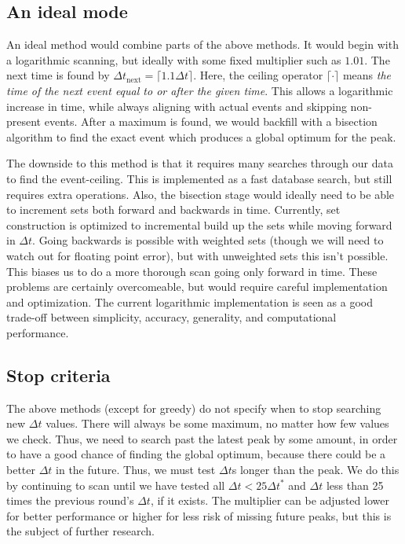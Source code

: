 \documentclass[draft]{article}
\begin{document}
\subsection{An ideal mode}
An ideal method would combine parts of the above methods.  It would
begin with a logarithmic scanning, but ideally with some fixed
multiplier such as $1.01$.  The next time is found by $\Delta
t_\mathrm{next} = \lceil 1.1\Delta t \rceil$.  Here, the ceiling
operator $\lceil \cdot \rceil$ means \textit{the time of the next
  event equal to or after the given time}.  This allows a logarithmic
increase in time, while always aligning with actual events and
skipping non-present events.  After a maximum is found, we would
backfill with a bisection algorithm to find the exact event which
produces a global optimum for the peak.

The downside to this method is that it requires many searches through
our data to find the event-ceiling.  This is implemented as a fast
database search, but still requires extra operations.  Also, the
bisection stage would ideally need to be able to increment sets both
forward and backwards in time.  Currently, set construction is
optimized to incremental build up the sets while moving forward in
$\Delta t$.  Going backwards is possible with weighted sets (though we
will need to watch out for floating point error), but with unweighted
sets this isn't possible.  This biases us to do a more thorough scan
going only forward in time.  These problems are certainly
overcomeable, but would require careful implementation and
optimization.  The current logarithmic implementation is seen as a
good trade-off between simplicity, accuracy, generality, and
computational performance.

\subsection{Stop criteria}
\label{sec:meth-stop-criteria}
The above methods (except for greedy) do not specify when to stop
searching new $\Delta t$ values.  There will always be some maximum,
no matter how few values we check.  Thus, we need to search past the
latest peak by some amount, in order to have a good chance of finding
the global optimum, because there could be a better $\Delta t$ in the
future.  Thus, we must test $\Delta t$s longer than the peak.  We do
this by continuing to scan until we have tested all $\Delta t <
25\Delta t^*$ and $\Delta t$ less than 25 times the previous round's
$\Delta t$, if it exists.  The multiplier can be adjusted lower for
better performance or higher for less risk of missing future peaks,
but this is the subject of further research.
\end{document}
